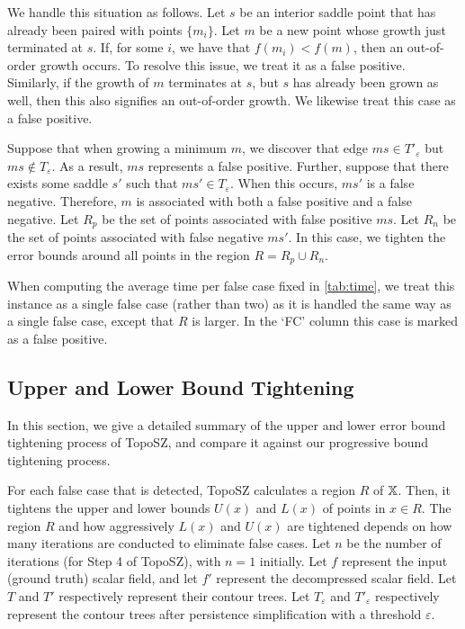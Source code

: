 We handle this situation as follows. Let $s$ be an interior saddle point that has already been paired with points $\{m_i\}$. Let $m$ be a new point whose growth just terminated at $s$. If, for some $i$, we have that $f(m_i) < f(m)$, then an out-of-order growth occurs. To resolve this issue, we treat it as a false positive. Similarly, if the growth of $m$ terminates at $s$, but $s$ has already been grown as well, then this also signifies an out-of-order growth. We likewise treat this case as a false positive.

Suppose that when growing a minimum $m$, we discover that edge $ms \in T'_\varepsilon$ but $ms \notin T_\varepsilon$. As a result, $ms$ represents a false positive. Further, suppose that there exists some saddle $s'$ such that $ms' \in T_\varepsilon$. When this occurs, $ms'$ is a false negative. Therefore, $m$ is associated with both a false positive and a false negative. Let $R_p$ be the set of points associated with false positive $ms$. Let $R_n$ be the set of points associated with false negative $ms'$. In this case, we tighten the error bounds around all points in the region $R = R_p \cup R_n$.

When computing the average time per false case fixed in \cref{tab:time}, we treat this instance as a single false case (rather than two) as it is handled the same way as a single false case, except that $R$ is larger. In the `FC' column this case is marked as a false positive.

\subsection{Upper and Lower Bound Tightening}
\label{sec:tighten-bounds}

In this section, we give a detailed summary of the upper and lower error bound tightening process of TopoSZ, and compare it against our progressive bound tightening process.

For each false case that is detected, TopoSZ calculates a region $R$ of $\mathbb{X}$. Then, it tightens the upper and lower bounds $U(x)$ and $L(x)$ of points in $x \in R$. The region $R$ and how aggressively $L(x)$ and $U(x)$ are tightened depends on how many iterations are conducted to eliminate false cases. 
Let $n$ be the number of iterations (for Step 4 of TopoSZ), with $n=1$ initially. Let $f$ represent the input (ground truth) scalar field, and let $f'$ represent the decompressed scalar field. 
Let $T$ and $T'$ respectively represent their contour trees. 
Let $T_\varepsilon$ and $T'_\varepsilon$ respectively represent the  contour trees after persistence simplification with a threshold $\varepsilon$.

